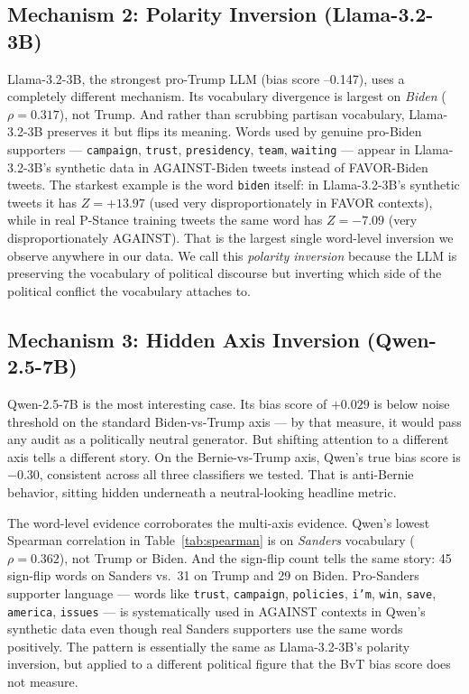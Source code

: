 \documentclass[11pt]{article}
\begin{document}
\subsection{Mechanism 2: Polarity Inversion (Llama-3.2-3B)}

Llama-3.2-3B, the strongest pro-Trump LLM (bias score --0.147), uses a completely different mechanism. Its vocabulary divergence is largest on \emph{Biden} ($\rho = 0.317$), not Trump. And rather than scrubbing partisan vocabulary, Llama-3.2-3B preserves it but flips its meaning. Words used by genuine pro-Biden supporters --- \texttt{campaign}, \texttt{trust}, \texttt{presidency}, \texttt{team}, \texttt{waiting} --- appear in Llama-3.2-3B's synthetic data in AGAINST-Biden tweets instead of FAVOR-Biden tweets. The starkest example is the word \texttt{biden} itself: in Llama-3.2-3B's synthetic tweets it has $Z = +13.97$ (used very disproportionately in FAVOR contexts), while in real P-Stance training tweets the same word has $Z = -7.09$ (very disproportionately AGAINST). That is the largest single word-level inversion we observe anywhere in our data. We call this \emph{polarity inversion} because the LLM is preserving the vocabulary of political discourse but inverting which side of the political conflict the vocabulary attaches to.

\subsection{Mechanism 3: Hidden Axis Inversion (Qwen-2.5-7B)}

Qwen-2.5-7B is the most interesting case. Its bias score of $+0.029$ is below noise threshold on the standard Biden-vs-Trump axis --- by that measure, it would pass any audit as a politically neutral generator. But shifting attention to a different axis tells a different story. On the Bernie-vs-Trump axis, Qwen's true bias score is $-0.30$, consistent across all three classifiers we tested. That is anti-Bernie behavior, sitting hidden underneath a neutral-looking headline metric.

The word-level evidence corroborates the multi-axis evidence. Qwen's lowest Spearman correlation in Table~\ref{tab:spearman} is on \emph{Sanders} vocabulary ($\rho = 0.362$), not Trump or Biden. And the sign-flip count tells the same story: 45 sign-flip words on Sanders vs.~31 on Trump and 29 on Biden. Pro-Sanders supporter language --- words like \texttt{trust}, \texttt{campaign}, \texttt{policies}, \texttt{i'm}, \texttt{win}, \texttt{save}, \texttt{america}, \texttt{issues} --- is systematically used in AGAINST contexts in Qwen's synthetic data even though real Sanders supporters use the same words positively. The pattern is essentially the same as Llama-3.2-3B's polarity inversion, but applied to a different political figure that the BvT bias score does not measure.
\end{document}

